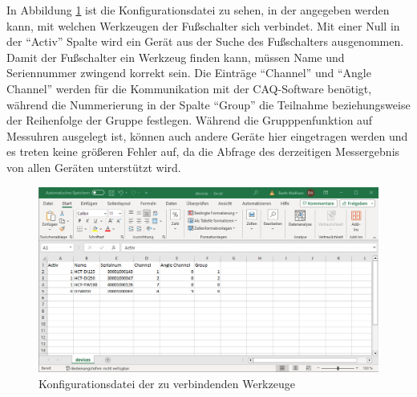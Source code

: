 In Abbildung \ref{fig:KonfigurationsdateiWerkzeuge} ist die Konfigurationsdatei zu sehen, in der angegeben werden kann, mit welchen Werkzeugen der Fußschalter sich verbindet. Mit einer Null in der ``Activ'' Spalte wird ein Gerät aus der Suche des Fußschalters ausgenommen. Damit der Fußschalter ein Werkzeug finden kann, müssen Name und Seriennummer zwingend korrekt sein. Die Einträge ``Channel'' und ``Angle Channel'' werden für die Kommunikation mit der \ac{CAQ}-Software benötigt, während die Nummerierung in der Spalte ``Group'' die Teilnahme beziehungsweise der Reihenfolge der Gruppe festlegen. Während die Grupppenfunktion auf Messuhren ausgelegt ist, können auch andere Geräte hier eingetragen werden und es treten keine größeren Fehler auf, da die Abfrage des derzeitigen Messergebnis von allen Geräten unterstützt wird.
\begin{figure}[H] 
	\centering
	\includegraphics[width=\textwidth]{figures/devicesDatei.png}
	\caption{Konfigurationsdatei der zu verbindenden Werkzeuge}
	\label{fig:KonfigurationsdateiWerkzeuge}
\end{figure}

